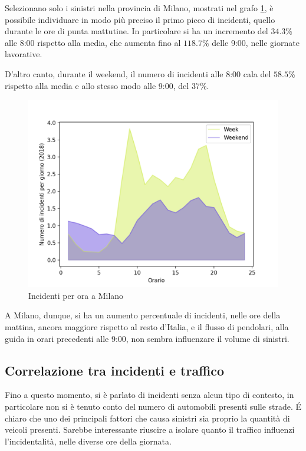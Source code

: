 \documentclass[a4paper,12pt]{report}
\begin{document}
Selezionano solo i sinistri nella provincia di Milano, mostrati nel grafo 
\ref{fig:week-weekend-milano}, è possibile individuare in modo più preciso
il primo picco di incidenti, quello durante le ore di punta mattutine.
In particolare si ha un incremento del $34.3$\% alle 8:00 rispetto alla media, 
che aumenta fino al $118.7$\% delle 9:00, nelle giornate lavorative.

D'altro canto, durante il weekend, il numero di incidenti alle 8:00 cala del $58.5$\% rispetto 
alla media e allo stesso modo alle 9:00, del $37$\%.

\begin{figure}
    \includegraphics[width=\linewidth]{../src/incidenti/incidenti_senza_coords/ore_punta/week_weekend_milano.png}
    \caption{Incidenti per ora a Milano}
    \label{fig:week-weekend-milano}
\end{figure}

A Milano, dunque, si ha un aumento percentuale di incidenti, nelle ore della mattina, 
ancora maggiore rispetto al resto d'Italia, e il flusso di pendolari, 
alla guida in orari precedenti alle 9:00, 
non sembra influenzare il volume di sinistri.

\subsection{Correlazione tra incidenti e traffico}

Fino a questo momento, si è parlato di incidenti senza alcun tipo di contesto, in 
particolare non si è tenuto conto del numero di automobili presenti sulle strade. 
\'E chiaro che uno dei principali fattori che causa sinistri sia proprio 
la quantità di veicoli presenti. 
Sarebbe interessante riuscire a isolare quanto 
il traffico influenzi l'incidentalità, nelle diverse ore della giornata.
\end{document}
